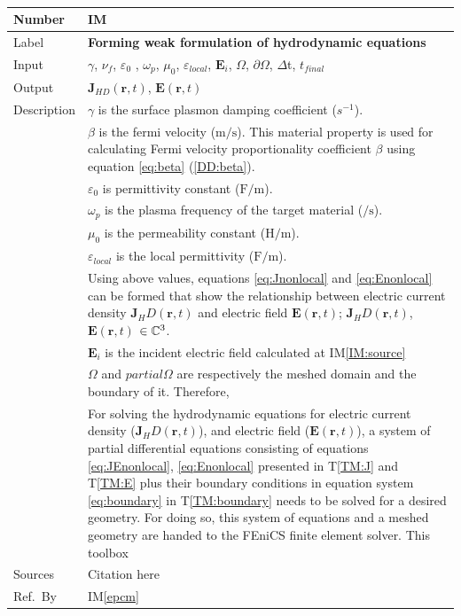 \documentclass[12pt]{article}
\newcommand{\colAwidth}{0.13\textwidth}
\newcommand{\colBwidth}{0.82\textwidth}
\newcounter{instnum} %
\newcommand{\iref}[1]{IM\ref{#1}}
\begin{document}
~\newline
\noindent
\begin{minipage}{\textwidth}
	\renewcommand*{\arraystretch}{1.5}
	\begin{tabular}{| p{\colAwidth} | p{\colBwidth}|}
		\hline
		\rowcolor[gray]{0.9}
		Number& IM{instnum}\theinstnum \label{IM:solve}\\
		\hline
		Label& \bf Forming weak formulation of hydrodynamic equations\\
		\hline
		Input& $\gamma$, $\nu_f$, $\varepsilon_0$ , $\omega_p$, $\mu_{0}$, $\varepsilon_{local}$, $\textbf{E}_i$, $\Omega$, $\partial \Omega$, $\Delta$t, $t_{final}$
		\\
		\hline
		Output&  $\textbf{J}_{HD}(\textbf{r},t)$, $\textbf{E}(\textbf{r},t)$ \\
		\hline
		Description
		& $\gamma$ is the surface plasmon damping coefficient ($s^{-1}$).\\ 
		& $\beta$ is the fermi velocity ($\si{\meter \per \second}$). This material property is used for calculating Fermi velocity proportionality coefficient $\beta$ using equation \ref{eq:beta}  (\ref{DD:beta}).\\
		& $\varepsilon_{0}$ is permittivity constant ($\si{\farad \per \meter}$). \\
		& $\omega_p$ is the plasma frequency of the target material ($\si{\per \second}$).\\
		& $\mu_{0}$ is the permeability constant ($\si{\henry \per \meter}$). \\
		& $\varepsilon_{local}$ is the local permittivity ($\si{\farad \per \meter}$).\\
		& Using above values, equations \ref{eq:Jnonlocal} and \ref{eq:Enonlocal} can be formed that show the relationship between electric current density $\textbf{J}_HD(\textbf{r},t)$ and electric field $\textbf{E}(\textbf{r},t)$; $\textbf{J}_HD(\textbf{r},t)$, $\textbf{E}(\textbf{r},t)$ $\in \Bbb C^3$.\\
		
		& $\textbf{E}_i$ is the incident electric field calculated at IM\ref{IM:source} \\
		& $\Omega$ and $partial \Omega$ are respectively the meshed domain and the boundary of it. Therefore,    \\
		&       
		For solving the hydrodynamic equations for electric current density ($\textbf{J}_HD(\textbf{r},t)$), and electric field ($\textbf{E}(\textbf{r},t)$), a system of partial differential equations consisting of equations \ref{eq:JEnonlocal}, \ref{eq:Enonlocal} presented in T\ref{TM:J} and T\ref{TM:E} plus their boundary conditions in equation system \ref{eq:boundary} in T\ref{TM:boundary} needs to be solved for a desired geometry. For doing so, this system of equations and a meshed geometry are handed to the FEniCS finite element solver. This toolbox   
		\\
		\hline
		Sources& Citation here \\
		\hline
		Ref.\ By & \iref{epcm}\\
		\hline
	\end{tabular}
\end{minipage}\\
\end{document}
